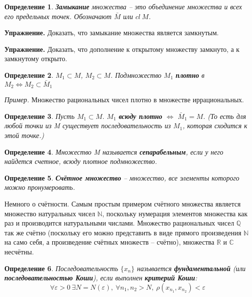 \documentclass[12pt]{article}
\newcommand{\example}{{\itshape Пример. }}
\newcommand{\equals}{\Leftrightarrow}
\newcommand{\exc}{{\bfseries Упражнение. }}
\newtheorem{defi}{Определение}[section]
\begin{document}
	\begin{defi}
		\textbf{Замыкание} множества -- это объединение множества и всех его предельных точек. Обозначают $\bar{M}$ или $cl ~ M$.
	\end{defi}
	
	\exc Доказать, что замыкание множества является замкнутым.
	
	\exc Доказать, что дополнение к открытому множеству замкнуто, а к замкнутому открыто.
	
	\begin{defi}
		$M_1 \subset M$, $M_2 \subset M$. Подмножество $M_1$ \textbf{плотно} в $M_2 \equals M_2 \subset \bar{M}_1$
	\end{defi}
	
	\example Множество рациональных чисел плотно в множестве иррациональных.
	
	\begin{defi}
		Пусть $M_1 \subset M$. $M_1$ \textbf{всюду плотно} $\equals$ $\bar{M}_1 = M$. (То есть для любой точки из M существует 
		последовательность из $M_1$, которая сходится к этой точке.)
	\end{defi}
	
	\begin{defi}
		Множество M называется \textbf{сепарабельным}, если у него найдется счетное, всюду плотное подмножество.
	\end{defi}
	
	\begin{defi}
		\textbf{Счётное множество} -- множество, все элементы которого можно пронумеровать.
	\end{defi}

	{\color{gray} Немного о счётности. Самым простым примером счётного множества является множество натуральных чисел $\mathbb{N}$, поскольку нумерация элементов множества как раз и производится натуральными числами. Множество рациональных чисел $\mathbb{Q}$ так же счётно (поскольку его можно представить в виде прямого произведения $\mathbb{N}$ на само себя, а произведение счётных множеств -- счётно), множества $\mathbb{R}$ и $\mathbb{C}$ несчётны.}
	
	\begin{defi}
		Последовательность $\{x_n\}$ называется \textbf{фундаментальной} (или \textbf{последовательностью Коши}), если выполнен 
		\textbf{критерий Коши}:
		$$\forall \varepsilon > 0 ~\exists N = N(\varepsilon),~ \forall n_1, n_2 > N,~ \rho(x_{n_1}, x_{n_2}) < \varepsilon$$
	\end{defi}
\end{document}
